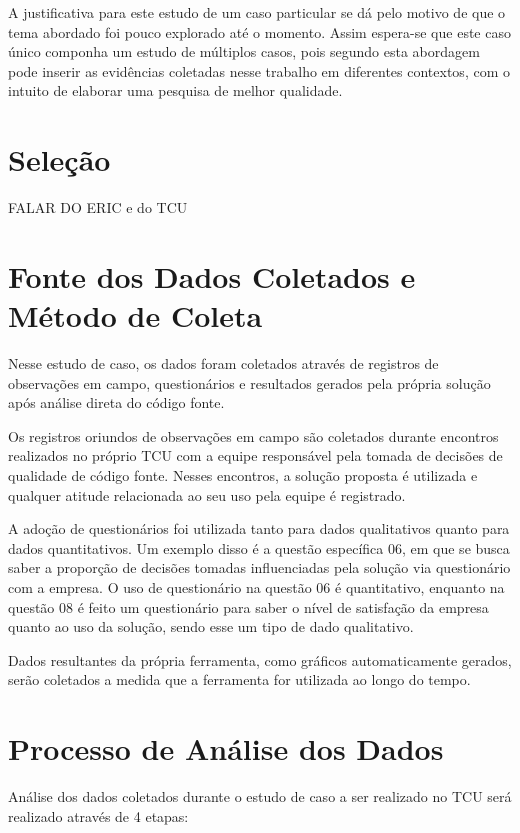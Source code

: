 A justificativa para este estudo de um caso particular se dá pelo motivo de que o tema abordado foi pouco explorado até o momento. Assim espera-se que este caso único componha um estudo de múltiplos casos, pois segundo  esta abordagem pode inserir as evidências coletadas nesse trabalho em diferentes contextos, com o intuito de elaborar uma pesquisa de melhor qualidade.

\section{Seleção} \label{sec:Seleção}

FALAR DO ERIC e do TCU

\section{Fonte dos Dados Coletados e Método de Coleta} \label{sec:Fonte e Método de Coleta de Dados}

Nesse estudo de caso, os dados foram coletados através de registros de observações em campo, questionários e resultados gerados pela própria solução após análise direta do código fonte.

Os registros oriundos de observações em campo são coletados durante encontros realizados no próprio TCU com a equipe responsável pela tomada de decisões de qualidade de código fonte. Nesses encontros, a solução proposta é utilizada e qualquer atitude relacionada ao seu uso pela equipe é registrado.

A adoção de questionários foi utilizada tanto para dados qualitativos quanto para dados quantitativos. Um exemplo disso é a questão específica 06, em que se busca saber a proporção de decisões tomadas influenciadas pela solução via questionário com a empresa. O uso de questionário na questão 06 é quantitativo, enquanto na questão 08 é feito um questionário para saber o nível de satisfação da empresa quanto ao uso da solução, sendo esse um tipo de dado qualitativo.

Dados resultantes da própria ferramenta, como gráficos automaticamente gerados, serão coletados a medida que a ferramenta for utilizada ao longo do tempo.

\section{Processo de Análise dos Dados} \label{sec:Análise}

Análise dos dados coletados durante o estudo de caso a ser realizado no TCU será realizado através de 4 etapas:

